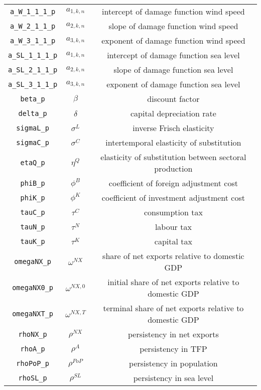 \begin{center}
\begin{longtable}{ccc}
\texttt{a\_W\_1\_1\_1\_p} & ${a_{1,k,n}}$ & intercept of damage function wind speed\\
\texttt{a\_W\_2\_1\_1\_p} & ${a_{2,k,n}}$ & slope of damage function wind speed\\
\texttt{a\_W\_3\_1\_1\_p} & ${a_{3,k,n}}$ & exponent of damage function wind speed\\
\texttt{a\_SL\_1\_1\_1\_p} & ${a_{1,k,n}}$ & intercept of damage function sea level\\
\texttt{a\_SL\_2\_1\_1\_p} & ${a_{2,k,n}}$ & slope of damage function sea level\\
\texttt{a\_SL\_3\_1\_1\_p} & ${a_{3,k,n}}$ & exponent of damage function sea level\\
\texttt{beta\_p} & ${\beta}$ & discount factor\\
\texttt{delta\_p} & ${\delta}$ & capital depreciation rate\\
\texttt{sigmaL\_p} & ${\sigma^{L}}$ & inverse Frisch elasticity\\
\texttt{sigmaC\_p} & ${\sigma^{C}}$ & intertemporal elasticity of substitution\\
\texttt{etaQ\_p} & ${\eta^{Q}}$ & elasticity of substitution between sectoral production\\
\texttt{phiB\_p} & ${\phi^{B}}$ & coefficient of foreign adjustment cost\\
\texttt{phiK\_p} & ${\phi^{K}}$ & coefficient of investment adjustment cost\\
\texttt{tauC\_p} & ${\tau^{C}}$ & consumption tax\\
\texttt{tauN\_p} & ${\tau^{N}}$ & labour tax\\
\texttt{tauK\_p} & ${\tau^{K}}$ & capital tax\\
\texttt{omegaNX\_p} & ${\omega^{NX}}$ & share of net exports relative to domestic GDP\\
\texttt{omegaNX0\_p} & ${\omega^{NX,0}}$ & initial share of net exports relative to domestic GDP\\
\texttt{omegaNXT\_p} & ${\omega^{NX,T}}$ & terminal share of net exports relative to domestic GDP\\
\texttt{rhoNX\_p} & ${\rho^{NX}}$ & persistency in net exports\\
\texttt{rhoA\_p} & ${\rho^{A}}$ & persistency in TFP\\
\texttt{rhoPoP\_p} & ${\rho^{PoP}}$ & persistency in population\\
\texttt{rhoSL\_p} & ${\rho^{SL}}$ & persistency in sea level\\

\end{longtable}
\end{center}
